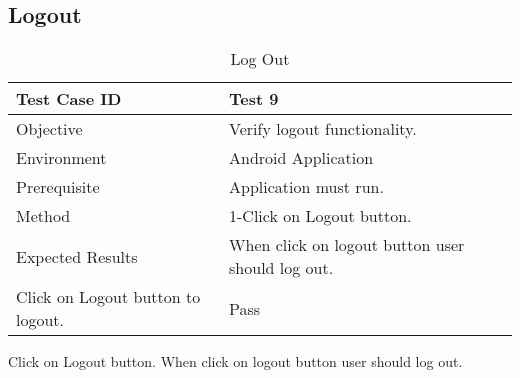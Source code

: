 \subsection{Logout}
\begin{table}[ht]
\centering
\label{Log Out}
\begin{tabular}{|l|l|}
\hline
Test Case ID                                          & Test 9                                    \\ \hline
Objective                                             & Verify logout functionality.              \\ \hline
Environment                                           & Android Application                       \\ \hline
Prerequisite                                          & Application must run.                     \\ \hline
Method                                                & 1-Click on Logout button.                 \\ \hline
Expected Results                                      & When click on logout button user should log out. \\ \hline
Click on Logout button to logout. & Pass                                      \\ \hline
\end{tabular}
\caption{Log Out}
\end{table}
Click on Logout button.  When click on logout button user should log out.

\newpage
